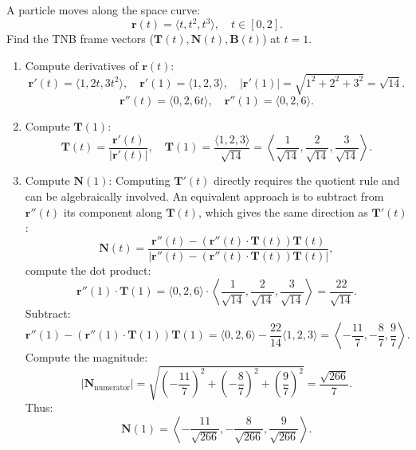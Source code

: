 \exampleline
\begin{example}
A particle moves along the space curve:
\[
\mathbf{r}(t) = \langle t, t^2, t^3 \rangle, \quad t \in [0, 2].
\]
Find the TNB frame vectors (\( \mathbf{T}(t), \mathbf{N}(t), \mathbf{B}(t) \)) at \( t = 1 \).

\begin{solution}
\begin{enumerate}
    \item Compute derivatives of \( \mathbf{r}(t) \):
    \[
    \mathbf{r}'(t) = \langle 1, 2t, 3t^2 \rangle, \quad \mathbf{r}'(1) = \langle 1, 2, 3 \rangle, \quad |\mathbf{r}'(1)| = \sqrt{1^2 + 2^2 + 3^2} = \sqrt{14}.
    \]
    \[
    \mathbf{r}''(t) = \langle 0, 2, 6t \rangle, \quad \mathbf{r}''(1) = \langle 0, 2, 6 \rangle.
    \]

    \item Compute \( \mathbf{T}(1) \):
    \[
    \mathbf{T}(t) = \frac{\mathbf{r}'(t)}{|\mathbf{r}'(t)|}, \quad \mathbf{T}(1) = \frac{\langle 1, 2, 3 \rangle}{\sqrt{14}} = \left\langle \frac{1}{\sqrt{14}}, \frac{2}{\sqrt{14}}, \frac{3}{\sqrt{14}} \right\rangle.
    \]

    \item Compute \( \mathbf{N}(1) \):
    Computing \( \mathbf{T}'(t) \) directly requires the quotient rule and can be algebraically involved. An equivalent approach is to subtract from \( \mathbf{r}''(t) \) its component along \( \mathbf{T}(t) \), which gives the same direction as \( \mathbf{T}'(t) \):
    \[
    \mathbf{N}(t) = \frac{\mathbf{r}''(t) - \left( \mathbf{r}''(t) \cdot \mathbf{T}(t) \right)\mathbf{T}(t)}{\left| \mathbf{r}''(t) - \left( \mathbf{r}''(t) \cdot \mathbf{T}(t) \right)\mathbf{T}(t) \right|},
    \]
    compute the dot product:
    \[
    \mathbf{r}''(1) \cdot \mathbf{T}(1) = \langle 0, 2, 6 \rangle \cdot \left\langle \frac{1}{\sqrt{14}}, \frac{2}{\sqrt{14}}, \frac{3}{\sqrt{14}} \right\rangle = \frac{22}{\sqrt{14}}.
    \]
    Subtract:
    \[
    \mathbf{r}''(1) - \left( \mathbf{r}''(1) \cdot \mathbf{T}(1) \right) \mathbf{T}(1) = \langle 0, 2, 6 \rangle - \frac{22}{14} \langle 1, 2, 3 \rangle = \left\langle -\frac{11}{7}, -\frac{8}{7}, \frac{9}{7} \right\rangle.
    \]
    Compute the magnitude:
    \[
    \left| \mathbf{N}_{\text{numerator}} \right| = \sqrt{\left( -\frac{11}{7} \right)^2 + \left( -\frac{8}{7} \right)^2 + \left( \frac{9}{7} \right)^2} = \frac{\sqrt{266}}{7}.
    \]
    Thus:
    \[
    \mathbf{N}(1) = \left\langle -\frac{11}{\sqrt{266}}, -\frac{8}{\sqrt{266}}, \frac{9}{\sqrt{266}} \right\rangle.
    \]


\end{enumerate}
\end{solution}
\end{example}
